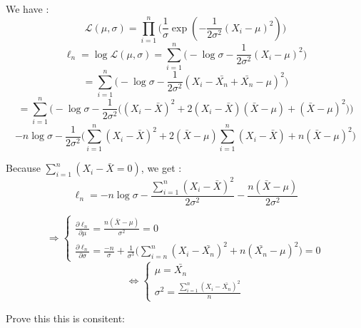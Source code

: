 \documentclass[10pt]{article}
\newenvironment{problem}[2][Problem]{\begin{trivlist}
\item[\hskip \labelsep {\bfseries #1}\hskip \labelsep {\bfseries #2.}]}{\end{trivlist}}
\begin{document}
\begin{problem}{2}

We have :\\
\[\mathcal{L}(\mu, \sigma)=\prod_{i=1}^n\Big(\frac{1}{\sigma}\exp({-\frac{1}{2\sigma^2}(X_i-\mu)^2})\Big)\]
\[\ell_n=\log \mathcal{L}(\mu, \sigma)=\sum_{i=1}^n\Big( -\log\sigma-\frac{1}{2\sigma^2}(X_i-\mu)^2\Big)\]
\[=\sum_{i=1}^n\Big(-\log\sigma -\frac{1}{2\sigma^2}(X_i-\bar{X_n}+\bar{X_n}-\mu)^2\Big)\]
\[=\sum_{i=1}^n\Big(-\log\sigma -\frac{1}{2\sigma^2}\Big((X_i-\bar{X})^2+2(X_i-\bar{X})(\bar{X}-\mu) +(\bar{X}-\mu)^2\Big)\Big)\]
\[-n\log\sigma - \frac{1}{2\sigma^2}\Big( \sum_{i=1}^n(X_i-\bar{X})^2+2(\bar{X}-\mu)\sum_{i=1}^n(X_i-\bar{X})+n(\bar{X}-\mu)^2\Big)\]

Because $\sum_{i=1}^n(X_i-\bar{X}=0)$, we get : \\
\[\ell_n=-n\log\sigma -\frac{\sum_{i=1}^n(X_i-\bar{X})^2}{2\sigma^2}-\frac{n(\bar{X}-\mu)}{2\sigma^2}\]

\[\Rightarrow \begin{cases} \frac{\partial \ell_n}{\partial \mu}=\frac{n(\bar{X
}-\mu)}{\sigma^2}=0\\ \frac{\partial \ell_n}{\partial \sigma}=\frac{-n}{\sigma}+\frac{1}{\sigma^3}\Big( \sum_{i=n}^n(X_i-\bar{X_n})^2+n(\bar{X_n}-\mu)^2\Big)=0 \end{cases}\]
\[\Leftrightarrow \begin{cases} \mu=\bar{X_n}\\ \sigma^2=\frac{\sum_{i=1}^n(X_i-\bar{X_n})^2}{n}\end{cases}\]

Prove this this is consitent: \\


\end{problem}
\end{document}
